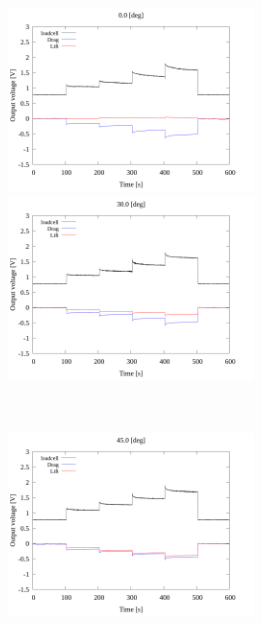   \begin{figure}[htbp]
        \begin{minipage}[b]{0.45\linewidth}
          \centering
          \includegraphics[width=65mm]{../../02_workspace/result/2-1/plot/01-3_allsensors/01_allsensors_0.png}
        \end{minipage}
        \begin{minipage}[b]{0.45\linewidth}
          \centering
          \includegraphics[width=65mm]{../../02_workspace/result/2-1/plot/01-3_allsensors/01_allsensors_300.png}
        \end{minipage} \\
        \begin{minipage}[b]{0.45\linewidth}
            \centering
            \includegraphics[width=65mm]{../../02_workspace/result/2-1/plot/01-3_allsensors/01_allsensors_450.png}
          \end{minipage}
          \begin{minipage}[b]{0.45\linewidth}

\end{minipage}
\end{figure}

